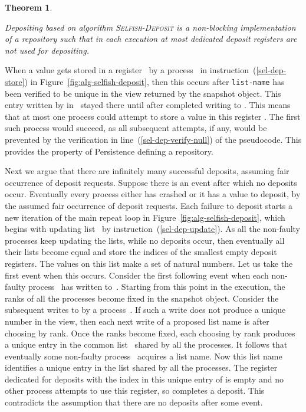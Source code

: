 \documentclass[11pt]{article}
\newcommand{\qed}{\hfill  \smallbreak}
\newenvironment{proof}{\noindent{\bf Proof:}}{\qed}
\newtheorem{theorem}{Theorem}
\begin{document}
\begin{theorem}
\label{thm:selfish-deposit}

Depositing based on algorithm \textsc{Selfish-Deposit} is a non-blocking implementation of a repository such that in each execution at most  dedicated deposit registers are not  used for depositing.
\end{theorem}


\begin{proof} 
When a value  gets stored in a register~ by a process~ in instruction~(\ref{sel-dep-store}) in Figure~\ref{fig:alg-selfish-deposit}, then this occurs after \texttt{list-name} has been verified to be unique in the view returned by the snapshot object. 
This entry written by  in~ stayed there until after  completed writing to .
This means that at most one process could attempt to store a value in this register .
The first such process would succeed, as all subsequent attempts, if any, would be prevented by the verification in line~(\ref{sel-dep-verify-null}) of the pseudocode.
This provides the property of Persistence defining a repository.

Next we argue that there are infinitely many successful deposits, assuming fair occurrence  of deposit requests. 
Suppose there is an event after which no deposits occur.
Eventually every process either has crashed or it has a value to deposit, by the assumed fair occurrence of deposit requests.
Each failure to deposit starts a new iteration of the main repeat loop in Figure~\ref{fig:alg-selfish-deposit}, which begins with updating list~ by instruction~(\ref{sel-dep-update}).
As all the non-faulty processes keep updating the lists, while no deposits occur, then eventually all their lists become equal and store the indices of the smallest empty deposit registers.
The values on this list make a set of  natural numbers. 
Let us take the first event when this occurs.
Consider the first following event when each non-faulty process~ has written to~.
Starting from this point in the execution, the ranks of all the processes become fixed in the snapshot object.
Consider the subsequent writes to  by a process~.
If such a write does not produce a unique number in the view, then each next write of a proposed list name is after choosing by rank.
Once the ranks become fixed, each choosing by rank produces a unique entry in the common list~ shared by all the processes.
It follows that eventually some non-faulty process~ acquires a list name.
Now this list name identifies a unique entry in the list  shared by all the processes.
The register dedicated for deposits with the index in this unique entry of  is empty and no other process attempts to use this register, so  completes a deposit.
This contradicts the assumption that there are no deposits after some event.


\end{proof}
\end{document}
